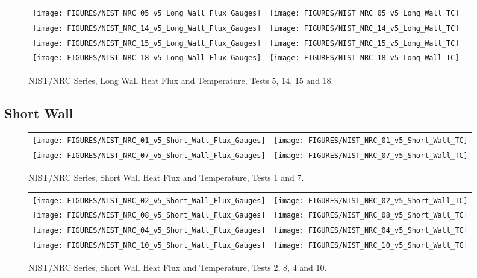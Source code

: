 \begin{figure}[p]
\begin{tabular*}{\textwidth}{l@{\extracolsep{\fill}}r}
\texttt{[image: FIGURES/NIST\_NRC\_05\_v5\_Long\_Wall\_Flux\_Gauges]} &
\texttt{[image: FIGURES/NIST\_NRC\_05\_v5\_Long\_Wall\_TC]} \\
\texttt{[image: FIGURES/NIST\_NRC\_14\_v5\_Long\_Wall\_Flux\_Gauges]} &
\texttt{[image: FIGURES/NIST\_NRC\_14\_v5\_Long\_Wall\_TC]} \\
\texttt{[image: FIGURES/NIST\_NRC\_15\_v5\_Long\_Wall\_Flux\_Gauges]} &
\texttt{[image: FIGURES/NIST\_NRC\_15\_v5\_Long\_Wall\_TC]} \\
\texttt{[image: FIGURES/NIST\_NRC\_18\_v5\_Long\_Wall\_Flux\_Gauges]} &
\texttt{[image: FIGURES/NIST\_NRC\_18\_v5\_Long\_Wall\_TC]}
\end{tabular*}
\caption{NIST/NRC Series, Long Wall Heat Flux and Temperature, Tests 5, 14, 15 and 18.}
\label{NIST_NRC_Long_4}
\end{figure}

\clearpage



\subsection{Short Wall}

\vspace{2in}


\begin{figure}[h!]
\begin{tabular*}{\textwidth}{l@{\extracolsep{\fill}}r}
\texttt{[image: FIGURES/NIST\_NRC\_01\_v5\_Short\_Wall\_Flux\_Gauges]} &
\texttt{[image: FIGURES/NIST\_NRC\_01\_v5\_Short\_Wall\_TC]} \\
\texttt{[image: FIGURES/NIST\_NRC\_07\_v5\_Short\_Wall\_Flux\_Gauges]} &
\texttt{[image: FIGURES/NIST\_NRC\_07\_v5\_Short\_Wall\_TC]}

\end{tabular*}
\caption{NIST/NRC Series, Short Wall Heat Flux and Temperature, Tests 1 and 7.}
\label{NIST_NRC_Short_1}
\end{figure}

\begin{figure}[p]
\begin{tabular*}{\textwidth}{l@{\extracolsep{\fill}}r}
\texttt{[image: FIGURES/NIST\_NRC\_02\_v5\_Short\_Wall\_Flux\_Gauges]} &
\texttt{[image: FIGURES/NIST\_NRC\_02\_v5\_Short\_Wall\_TC]} \\
\texttt{[image: FIGURES/NIST\_NRC\_08\_v5\_Short\_Wall\_Flux\_Gauges]} &
\texttt{[image: FIGURES/NIST\_NRC\_08\_v5\_Short\_Wall\_TC]} \\
\texttt{[image: FIGURES/NIST\_NRC\_04\_v5\_Short\_Wall\_Flux\_Gauges]} &
\texttt{[image: FIGURES/NIST\_NRC\_04\_v5\_Short\_Wall\_TC]} \\
\texttt{[image: FIGURES/NIST\_NRC\_10\_v5\_Short\_Wall\_Flux\_Gauges]} &
\texttt{[image: FIGURES/NIST\_NRC\_10\_v5\_Short\_Wall\_TC]}

\end{tabular*}
\caption{NIST/NRC Series, Short Wall Heat Flux and Temperature, Tests 2, 8, 4 and 10.}
\label{NIST_NRC_Short_2}
\end{figure}

